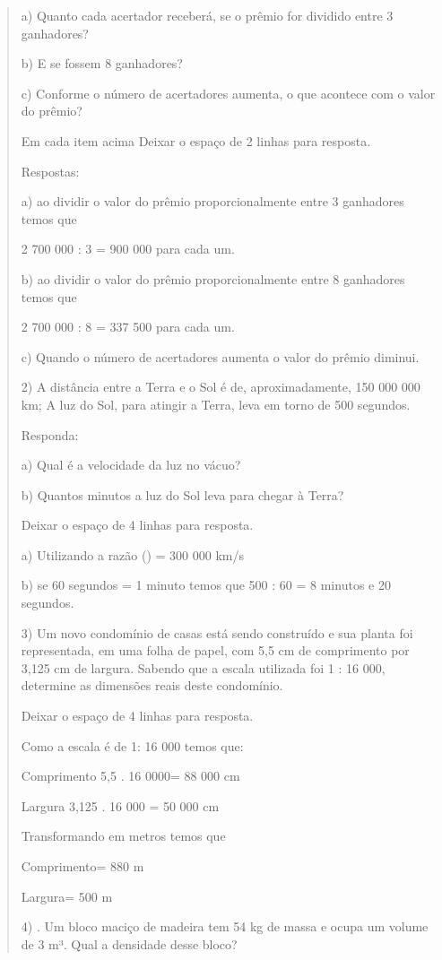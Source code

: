 \begin{quote}
\begin{escolha}
a) Quanto cada acertador receberá, se o prêmio for dividido entre 3
ganhadores?

b) E se fossem 8 ganhadores?

c) Conforme o número de acertadores aumenta, o que acontece com o valor
do prêmio?

Em cada item acima Deixar o espaço de 2 linhas para resposta.

Respostas:

a) ao dividir o valor do prêmio proporcionalmente entre 3 ganhadores
temos que

2 700 000 : 3 = 900 000 para cada um.

b) ao dividir o valor do prêmio proporcionalmente entre 8 ganhadores
temos que

2 700 000 : 8 = 337 500 para cada um.

c) Quando o número de acertadores aumenta o valor do prêmio diminui.

2) A distância entre a Terra e o Sol é de, aproximadamente, 150 000 000
km; A luz do Sol, para atingir a Terra, leva em torno de 500 segundos.

Responda:

a) Qual é a velocidade da luz no vácuo?

b) Quantos minutos a luz do Sol leva para chegar à Terra?

Deixar o espaço de 4 linhas para resposta.

a) Utilizando a razão 
() = 300 000 km/s

b) se 60 segundos = 1 minuto temos que 500 : 60 = 8 minutos e 20
segundos.

3) Um novo condomínio de casas está sendo construído e sua planta foi
representada, em uma folha de papel, com 5,5 cm de comprimento por 3,125
cm de largura. Sabendo que a escala utilizada foi 1 : 16 000, determine
as dimensões reais deste condomínio.

Deixar o espaço de 4 linhas para resposta.

Como a escala é de 1: 16 000 temos que:

Comprimento 5,5 . 16 0000= 88 000 cm

Largura 3,125 . 16 000 = 50 000 cm

Transformando em metros temos que

Comprimento= 880 m

Largura= 500 m

4) . Um bloco maciço de madeira tem 54 kg de massa e ocupa um volume de
3 m³. Qual a densidade desse bloco?


\end{escolha}
\end{quote}
